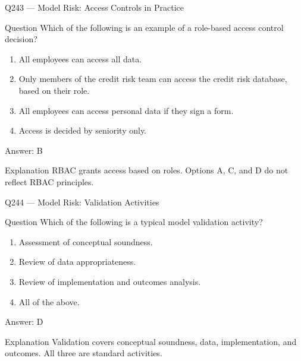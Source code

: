 \documentclass[aspectratio=169,8pt]{beamer}
\begin{document}
																													\begin{frame}{Q243 --- Model Risk: Access Controls in Practice}
																														\begin{block}{Question}
																															Which of the following is an example of a role-based access control decision?
																															\begin{enumerate}
																																\item All employees can access all data.
																																\item Only members of the credit risk team can access the credit risk database, based on their role.
																																\item All employees can access personal data if they sign a form.
																																\item Access is decided by seniority only.
																															\end{enumerate}  \end{block}
																															\begin{exampleblock}{Answer: B}\end{exampleblock}
																															\begin{block}{Explanation}
																																RBAC grants access based on roles. Options A, C, and D do not reflect RBAC principles.
																															\end{block}
																														\end{frame}
																														
																														\begin{frame}{Q244 --- Model Risk: Validation Activities}
																															\begin{block}{Question}
																																Which of the following is a typical model validation activity?
																																\begin{enumerate}
																																	\item Assessment of conceptual soundness.
																																	\item Review of data appropriateness.
																																	\item Review of implementation and outcomes analysis.
																																	\item All of the above.
																																\end{enumerate}  \end{block}
																																\begin{exampleblock}{Answer: D}\end{exampleblock}
																																\begin{block}{Explanation}
																																	Validation covers conceptual soundness, data, implementation, and outcomes. All three are standard activities.
																																\end{block}
																															\end{frame}
																															
\end{document}
